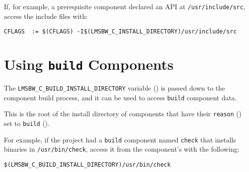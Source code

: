 If, for example, a prerequisite component declared an API at
\texttt{/usr/include/src}, access the include files with:

\begin{footnotesize}
\begin{verbatim}
CFLAGS  := $(CFLAGS) -I$(LMSBW_C_INSTALL_DIRECTORY)/usr/include/src
\end{verbatim}
\end{footnotesize}

\section{Using \texttt{build} Components}\label{wrap:using-build-components}

The \texttt{LMSBW\_C\_BUILD\_INSTALL\_DIRECTORY} variable
() is passed down to the component
build process, and it can be used to access \texttt{build} component
data.

This is the root of the install directory of components that have
their \texttt{reason} () set to \texttt{build}
().

For example, if the project had a \texttt{build} component named
\texttt{check} that installs binaries in \texttt{/usr/bin/check},
access it from the component's \makefile with the following:

\begin{verbatim}
$(LMSBW_C_BUILD_INSTALL_DIRECTORY)/usr/bin/check
\end{verbatim}
